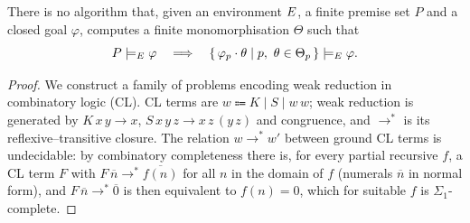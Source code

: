 \begin{theorem}
\label{thm:undecidable}
There is no algorithm that, given an environment $E$, a finite
premise set $P$ and a closed goal $\varphi$, computes a finite
monomorphisation $\Theta$ such that
\[
  P \models_{E} \varphi
  \quad\Longrightarrow\quad
  \{\,\varphi_p \cdot \theta \mid p,\ \theta \in \Theta_p\,\}
  \models_{E} \varphi .
\]
\end{theorem}

\begin{proof}
We construct a family of problems encoding weak reduction in
combinatory logic (CL).  CL terms are $w \Coloneqq K \mid S \mid
w\,w$; weak reduction is generated by $K\,x\,y \to x$,
$S\,x\,y\,z \to x\,z\,(y\,z)$ and congruence, and $\to^{*}$ is its
reflexive--transitive closure.  The relation $w \to^{*} w'$ between
ground CL terms is undecidable: by combinatory completeness
\cite{Barendregt1984} there is, for every partial recursive $f$, a
CL term $F$ with $F\,\overline{n} \to^{*} \overline{f(n)}$ for all
$n$ in the domain of $f$ (numerals $\overline{n}$ in normal form),
and $F\,\overline{n} \to^{*} \overline{0}$ is then equivalent to
$f(n) = 0$, which for suitable $f$ is $\Sigma_1$-complete.


\end{proof}
